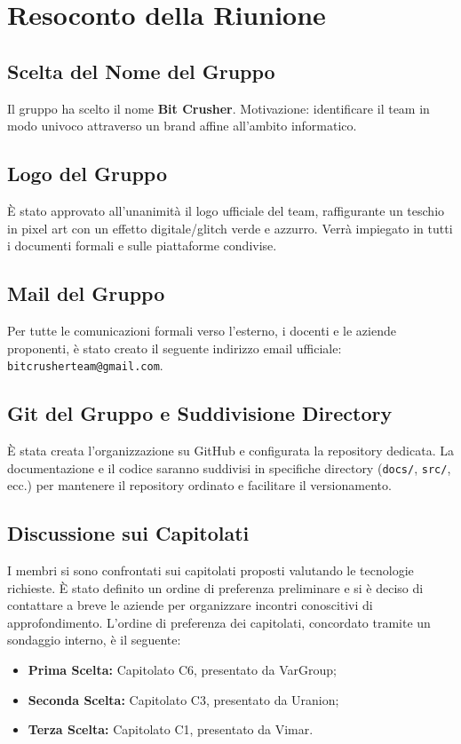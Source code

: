 \documentclass[a4paper, 11pt]{article}
\begin{document}
\newpage
\section{Resoconto della Riunione}

\subsection{Scelta del Nome del Gruppo}
Il gruppo ha scelto il nome \textbf{Bit Crusher}. Motivazione: identificare il team in modo univoco attraverso un brand affine all'ambito informatico.

\subsection{Logo del Gruppo}
È stato approvato all'unanimità il logo ufficiale del team, raffigurante un teschio in pixel art con un effetto digitale/glitch verde e azzurro. Verrà impiegato in tutti i documenti formali e sulle piattaforme condivise.

\subsection{Mail del Gruppo}
Per tutte le comunicazioni formali verso l'esterno, i docenti e le aziende proponenti, è stato creato il seguente indirizzo email ufficiale: \texttt{bitcrusherteam@gmail.com}.

\subsection{Git del Gruppo e Suddivisione Directory}
È stata creata l'organizzazione su GitHub e configurata la repository dedicata. La documentazione e il codice saranno suddivisi in specifiche directory (\texttt{docs/}, \texttt{src/}, ecc.) per mantenere il repository ordinato e facilitare il versionamento.

\subsection{Discussione sui Capitolati}
I membri si sono confrontati sui capitolati proposti valutando le tecnologie richieste. È stato definito un ordine di preferenza preliminare e si è deciso di contattare a breve le aziende per organizzare incontri conoscitivi di approfondimento. L'ordine di preferenza dei capitolati, concordato tramite un sondaggio interno, è il seguente:
\begin{itemize}
    \item \textbf{Prima Scelta:} Capitolato C6, presentato da VarGroup;
    \item \textbf{Seconda Scelta:} Capitolato C3, presentato da Uranion;
    \item \textbf{Terza Scelta:} Capitolato C1, presentato da Vimar.
\end{itemize}
\end{document}
